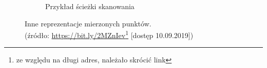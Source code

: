 \begin{figure}[H]
\begin{subfigure}{.5\textwidth}
      \caption{Przykład ścieżki skanowania}
      \label{fig:scanpaths}
    \end{subfigure}
    \caption[Inne reprezentacje mierzonych punktów]{Inne reprezentacje mierzonych punktów.\\\hspace{\textwidth}
    \small(źródło: \url{https://bit.ly/2MZnIev}\footnote{ze względu na długi adres, należało skrócić link} [dostęp 10.09.2019])}
    \label{fig:otherfigures}
\end{figure}